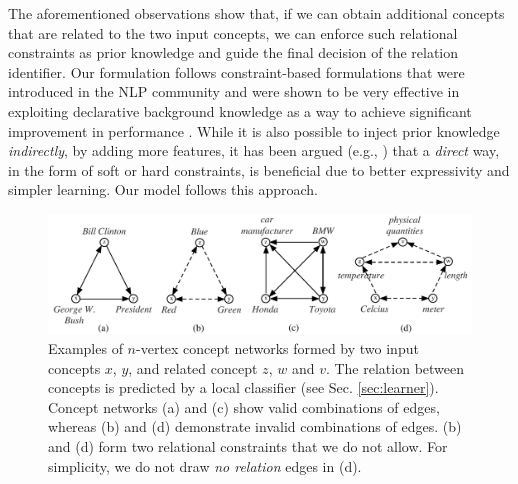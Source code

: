 The aforementioned observations show that, if we can obtain additional
concepts that are related to the two input concepts, we can enforce
such relational constraints as prior knowledge and guide the final
decision of the relation identifier. Our formulation follows
constraint-based formulations that were introduced in the NLP
community and were shown to be very effective in exploiting
declarative background knowledge as a way to achieve significant
improvement in performance
\cite{RothYi04,PRYZ05,CGRT09,DenisBa07,PunyakanokRoYi05}. While it is
also possible to inject prior knowledge {\em indirectly}, by adding
more features, it has been argued (e.g., \cite{RothYi05,ChangRaRo08})
that a {\em direct} way, in the form of soft or hard constraints, is
beneficial due to better expressivity and simpler learning. Our model
follows this approach.

\begin{figure}[!t]
\centering
\includegraphics[totalheight=0.1\textheight]{networks}
\caption{Examples of $n$-vertex concept networks formed by two input
  concepts $x$, $y$, and related concept $z$, $w$ and $v$. The
  relation between concepts is predicted by a local classifier (see
  Sec. \ref{sec:learner}). Concept networks (a) and (c) show valid
  combinations of edges, whereas (b) and (d) demonstrate invalid
  combinations of edges. (b) and (d) form two relational constraints
  that we do not allow. For simplicity, we do not draw {\em no
    relation} edges in (d).}
\label{fig:triangles}
\end{figure}

